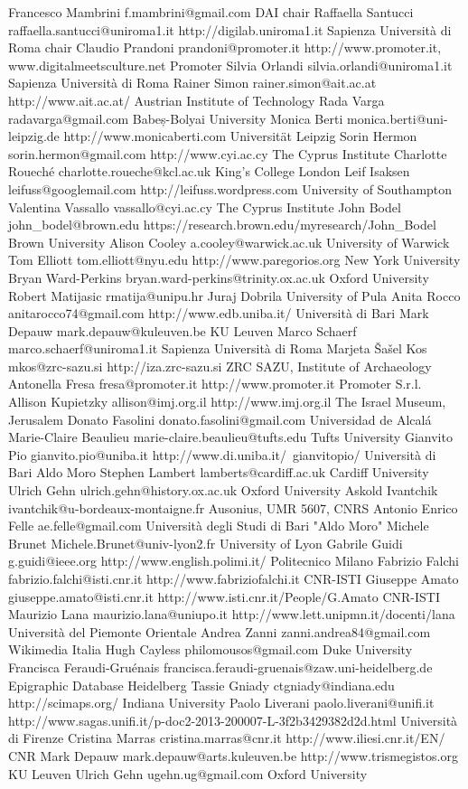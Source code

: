 \begin{contributors}
Francesco	Mambrini	f.mambrini@gmail.com		DAI	chair
Raffaella	Santucci	raffaella.santucci@uniroma1.it	http://digilab.uniroma1.it	Sapienza Università di Roma	chair
Claudio	Prandoni	prandoni@promoter.it	http://www.promoter.it, www.digitalmeetsculture.net	Promoter	
Silvia	Orlandi	silvia.orlandi@uniroma1.it		Sapienza Università di Roma	
Rainer	Simon	rainer.simon@ait.ac.at	http://www.ait.ac.at/	Austrian Institute of Technology	
Rada	Varga	radavarga@gmail.com		Babeș-Bolyai University	
Monica	Berti	monica.berti@uni-leipzig.de	http://www.monicaberti.com	Universität Leipzig	
Sorin	Hermon	sorin.hermon@gmail.com	http://www.cyi.ac.cy	The Cyprus Institute	
Charlotte	Roueché	charlotte.roueche@kcl.ac.uk		King's College London	
Leif	Isaksen	leifuss@googlemail.com	http://leifuss.wordpress.com	University of Southampton	
Valentina	Vassallo	vassallo@cyi.ac.cy		The Cyprus Institute	
John	Bodel	john_bodel@brown.edu	https://research.brown.edu/myresearch/John_Bodel	Brown University	
Alison	Cooley	a.cooley@warwick.ac.uk		University of Warwick	
Tom	Elliott	tom.elliott@nyu.edu	http://www.paregorios.org	New York University	
Bryan	Ward-Perkins	bryan.ward-perkins@trinity.ox.ac.uk		Oxford University	
Robert	Matijasic	rmatija@unipu.hr		Juraj Dobrila University of Pula	
Anita	Rocco	anitarocco74@gmail.com	http://www.edb.uniba.it/	Università di Bari	
Mark	Depauw	mark.depauw@kuleuven.be		KU Leuven	
Marco	Schaerf	marco.schaerf@uniroma1.it		Sapienza Università di Roma	
Marjeta	Šašel Kos	mkos@zrc-sazu.si	http://iza.zrc-sazu.si	ZRC SAZU, Institute of Archaeology	
Antonella	Fresa	fresa@promoter.it	http://www.promoter.it	Promoter S.r.l.	
Allison	Kupietzky	allison@imj.org.il	http://www.imj.org.il	The Israel Museum, Jerusalem	
Donato	Fasolini	donato.fasolini@gmail.com		Universidad de Alcalá	
Marie-Claire	Beaulieu	marie-claire.beaulieu@tufts.edu		Tufts University	
Gianvito	Pio	gianvito.pio@uniba.it	http://www.di.uniba.it/~gianvitopio/	Università di Bari Aldo Moro	
Stephen	Lambert	lamberts@cardiff.ac.uk		Cardiff University	
Ulrich	Gehn	ulrich.gehn@history.ox.ac.uk		Oxford University	
Askold	Ivantchik	ivantchik@u-bordeaux-montaigne.fr		Ausonius, UMR 5607, CNRS	
Antonio Enrico	Felle	ae.felle@gmail.com		Università degli Studi di Bari "Aldo Moro"	
Michele	Brunet	Michele.Brunet@univ-lyon2.fr		University of Lyon	
Gabrile	Guidi	g.guidi@ieee.org	http://www.english.polimi.it/	Politecnico Milano	
Fabrizio	Falchi	fabrizio.falchi@isti.cnr.it	http://www.fabriziofalchi.it	CNR-ISTI	
Giuseppe	Amato	giuseppe.amato@isti.cnr.it	http://www.isti.cnr.it/People/G.Amato	CNR-ISTI	
Maurizio	Lana	maurizio.lana@uniupo.it	http://www.lett.unipmn.it/docenti/lana	Università del Piemonte Orientale	
Andrea	Zanni	zanni.andrea84@gmail.com		Wikimedia Italia	
Hugh	Cayless	philomousos@gmail.com		Duke University	
Francisca	Feraudi-Gruénais	francisca.feraudi-gruenais@zaw.uni-heidelberg.de		Epigraphic Database Heidelberg	
Tassie	Gniady	ctgniady@indiana.edu	http://scimaps.org/	Indiana University	
Paolo	Liverani	paolo.liverani@unifi.it	http://www.sagas.unifi.it/p-doc2-2013-200007-L-3f2b3429382d2d.html	Università di Firenze	
Cristina	Marras	cristina.marras@cnr.it	http://www.iliesi.cnr.it/EN/	CNR	
Mark	Depauw	mark.depauw@arts.kuleuven.be	http://www.trismegistos.org	KU Leuven	
Ulrich	Gehn	ugehn.ug@gmail.com		Oxford University	


\end{contributors}